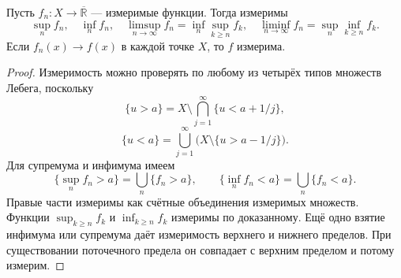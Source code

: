 \label{ticket:25}

\begin{theorem}
Пусть $f_n:X\to\overline{\mathbb R}$ --- измеримые функции.
Тогда измеримы
\[
  \sup_n f_n,\quad\inf_n f_n,\quad
  \limsup_{n\to\infty}f_n=\inf_n\sup_{k\ge n}f_k,\quad
  \liminf_{n\to\infty}f_n=\sup_n\inf_{k\ge n}f_k.
\]
Если $f_n(x)\to f(x)$ в каждой точке $X$, то $f$ измерима.
\end{theorem}

\begin{proof}
Измеримость можно проверять по любому из четырёх типов множеств Лебега, поскольку
\[
  \{u>a\}=X\setminus\bigcap_{j=1}^{\infty}\{u<a+1/j\},
\]
\[
  \{u<a\}=\bigcup_{j=1}^{\infty}\bigl(X\setminus\{u>a-1/j\}\bigr).
\]
Для супремума и инфимума имеем
\[
  \{\sup_n f_n>a\}=\bigcup_n\{f_n>a\},
  \qquad
  \{\inf_n f_n<a\}=\bigcup_n\{f_n<a\}.
\]
Правые части измеримы как счётные объединения измеримых множеств.
Функции $\sup_{k\ge n}f_k$ и $\inf_{k\ge n}f_k$ измеримы по доказанному.
Ещё одно взятие инфимума или супремума даёт измеримость верхнего и нижнего пределов.
При существовании поточечного предела он совпадает с верхним пределом и потому измерим.
\end{proof}
